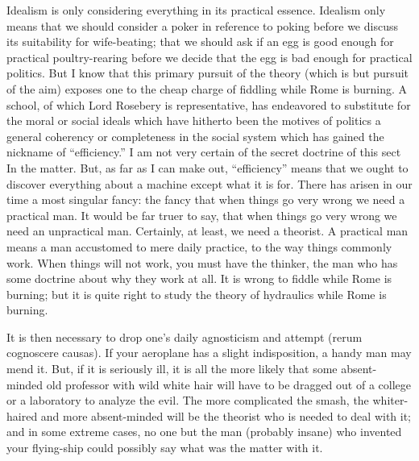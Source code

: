 \documentclass{book}
\begin{document}
Idealism is only considering everything in its practical essence. Idealism only means that we should consider a poker in reference to poking before we discuss its suitability for wife-beating; that we should ask if an egg is good enough for practical poultry-rearing before we decide that the egg is bad enough for practical politics. But I know that this primary pursuit of the theory (which is but pursuit of the aim) exposes one to the cheap charge of fiddling while Rome is burning. A school, of which Lord Rosebery is representative, has endeavored to substitute for the moral or social ideals which have hitherto been the motives of politics a general coherency or completeness in the social system which has gained the nickname of “efficiency.” I am not very certain of the secret doctrine of this sect In the matter. But, as far as I can make out, “efficiency” means that we ought to discover everything about a machine except what it is for. There has arisen in our time a most singular fancy: the fancy that when things go very wrong we need a practical man. It would be far truer to say, that when things go very wrong we need an unpractical man. Certainly, at least, we need a theorist. A practical man means a man accustomed to mere daily practice, to the way things commonly work. When things will not work, you must have the thinker, the man who has some doctrine about why they work at all. It is wrong to fiddle while Rome is burning; but it is quite right to study the theory of hydraulics while Rome is burning.

It is then necessary to drop one’s daily agnosticism and attempt (rerum cognoscere causas). If your aeroplane has a slight indisposition, a handy man may mend it. But, if it is seriously ill, it is all the more likely that some absent-minded old professor with wild white hair will have to be dragged out of a college or a laboratory to analyze the evil. The more complicated the smash, the whiter-haired and more absent-minded will be the theorist who is needed to deal with it; and in some extreme cases, no one but the man (probably insane) who invented your flying-ship could possibly say what was the matter with it.
\end{document}
